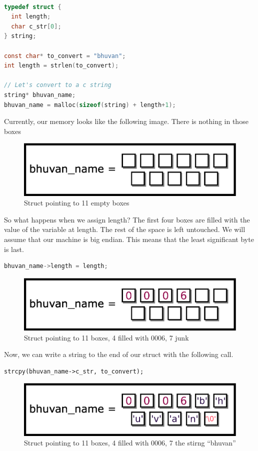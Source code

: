 \begin{lstlisting}[language=C]

typedef struct {
  int length;
  char c_str[0];
} string;

const char* to_convert = "bhuvan";
int length = strlen(to_convert);

// Let's convert to a c string
string* bhuvan_name;
bhuvan_name = malloc(sizeof(string) + length+1);
\end{lstlisting}

Currently, our memory looks like the following image.
There is nothing in those boxes

\begin{figure}[H]
\centering
\includegraphics[width=.7\textwidth]{introc/drawings/memory_model_empty.eps}
\caption{Struct pointing to 11 empty boxes}
\end{figure}

So what happens when we assign length?
The first four boxes are filled with the value of the variable at length.
The rest of the space is left untouched.
We will assume that our machine is big endian.
This means that the least significant byte is last.

\begin{lstlisting}[language=C]
bhuvan_name->length = length;
\end{lstlisting}

\begin{figure}[H]
\centering
\includegraphics[width=.7\textwidth]{introc/drawings/memory_model_length.eps}
\caption{Struct pointing to 11 boxes, 4 filled with 0006, 7 junk}
\end{figure}

Now, we can write a string to the end of our struct with the following call.

\begin{verbatim}
strcpy(bhuvan_name->c_str, to_convert);
\end{verbatim}

\begin{figure}[H]
\centering
\includegraphics[width=.7\textwidth]{introc/drawings/memory_model_full.eps}
\caption{Struct pointing to 11 boxes, 4 filled with 0006, 7 the stirng ``bhuvan''}
\end{figure}

